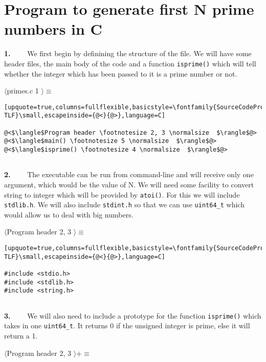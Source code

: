 \section{Program to generate first N prime numbers in C}

\textbf{1.}~~~~ We first begin by definining the structure of the file. We will have some header files, the main body of the
code and a function \texttt{isprime()} which will tell whether the integer which has been passed to it is a
prime number or not.
  
\par\noindent
$\langle$primes.c \footnotesize 1 \normalsize  $\rangle\equiv$\vspace{-10pt}

\begin{lstlisting}[upquote=true,columns=fullflexible,basicstyle=\fontfamily{SourceCodePro-TLF}\small,escapeinside={@<}{@>},language=C]

@<$\langle$Program header \footnotesize 2, 3 \normalsize  $\rangle$@>
@<$\langle$main() \footnotesize 5 \normalsize  $\rangle$@>
@<$\langle$isprime() \footnotesize 4 \normalsize  $\rangle$@>


\end{lstlisting}
\textbf{2.}~~~~ The executable can be run from command-line and will receive only one argument, which would be the value of
N. We will need some facility to convert string to integer which will be provided by \texttt{atoi()}. For this
we will include \texttt{stdlib.h}. We will also include \texttt{stdint.h} so that we can use \texttt{uint64\_t}
which would allow us to deal with big numbers.   
\par\noindent
$\langle$Program header \footnotesize 2, 3 \normalsize  $\rangle\equiv$\vspace{-10pt}

\begin{lstlisting}[upquote=true,columns=fullflexible,basicstyle=\fontfamily{SourceCodePro-TLF}\small,escapeinside={@<}{@>},language=C]

#include <stdio.h>
#include <stdlib.h>
#include <string.h>


\end{lstlisting}
\textbf{3.}~~~~ We will also need to include a prototype for the function \texttt{isprime()} which takes in one
\texttt{uint64\_t}. It returns 0 if the unsigned integer is prime, else it will return a 1.   
\par\noindent
$\langle$Program header \footnotesize 2, 3 \normalsize  $\rangle +\equiv$\vspace{-10pt}

